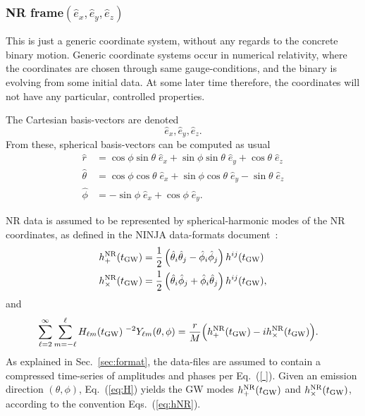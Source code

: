 \documentclass[11pt,tightenlines,article,amssymb,amsmath,amsfonts,superscriptaddress]{revtex4}
\newcommand{\ExNR}{\hat e_x}
\newcommand{\EyNR}{\hat e_y}
\newcommand{\EzNR}{\hat e_z}
\newcommand{\tNR}{\theta}
\newcommand{\pNR}{\phi}
\newcommand{\ErNR}{{\hat r}}
\newcommand{\EtNR}{{\hat\theta}}
\newcommand{\EpNR}{{\hat\phi}}
\newcommand{\hpNR}{h_+^{\rm NR}}
\newcommand{\hcNR}{h_{\times}^{\rm NR}}
\newcommand{\tGW}{t_{\rm GW}}
\begin{document}
\subsubsection{NR frame\boldmath$(  \ExNR, \EyNR, \EzNR)$}

This is just a generic coordinate system, without any regards to the
concrete binary motion.  Generic coordinate systems occur in numerical
relativity, where the coordinates are chosen through same
gauge-conditions, and the binary is evolving from some initial data.
At some later time therefore, the coordinates will not have any
particular, controlled properties.

The Cartesian basis-vectors are denoted
\begin{equation}
  \ExNR, \EyNR, \EzNR.
\end{equation}
From these, spherical basis-vectors can be computed as usual
\begin{subequations}
  \label{eq:NRspherical}
\begin{align}
  \ErNR & = \cos\pNR\sin\tNR\;\ExNR + \sin\pNR\sin\tNR\;\EyNR +\cos\tNR\;\EzNR\\
  \EtNR & = \cos\pNR\cos\tNR\;\ExNR + \sin\pNR\cos\tNR\;\EyNR -\sin\tNR\;\EzNR\\
  \EpNR & =        -\sin\pNR\;\ExNR +         \cos\pNR\;\EyNR.
\end{align}
\end{subequations}

NR data is assumed to be represented by spherical-harmonic modes of the
NR coordinates, as defined in the NINJA data-formats
document~\cite{Brown:2007jx}:
\begin{subequations}\label{eq:hNR}
\begin{align}
  \hpNR(\tGW) & = \frac{1}{2}\left(\EtNR_i\EtNR_j-\EpNR_i\EpNR_j\right)h^{ij}(\tGW)\\
  \hcNR(\tGW) & = \frac{1}{2}\left(\EtNR_i\EpNR_j+\EpNR_i\EtNR_j\right)h^{ij}(\tGW),
\end{align}
\end{subequations}
and
\begin{align}\label{eq:H}
  \sum_{\ell=2}^\infty\sum_{m=-\ell}^\ell H_{\ell m}&(\tGW)\;^{-2}Y_{\ell m}(\tNR,\pNR)
  = \frac{r}{M}\Big(\hpNR(\tGW)-i\hcNR(\tGW)\Big). %
\end{align}
As explained in Sec.~\ref{sec:format}, the data-files are assumed to
contain a compressed time-series of amplitudes and phases per
Eq.~(\ref{ }).  Given an emission direction $(\tNR,\pNR)$,
Eq.~(\ref{eq:H}) yields the GW modes $\hpNR(\tGW)$ and $\hcNR(\tGW)$,
according to the convention Eqs.~(\ref{eq:hNR}).
\end{document}
